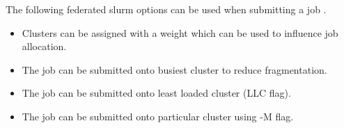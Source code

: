 \documentclass[conference]{IEEEtran}
\begin{document}
The following federated \gls{slurm} options can be used when submitting a job .

\begin{itemize}
    \item Clusters can be assigned with a weight which can be used to influence job allocation.
    \item The job can be submitted onto busiest cluster to reduce fragmentation.
    \item The job can be submitted onto least loaded cluster (LLC flag).
    \item The job can be submitted onto particular cluster using -M flag.
\end{itemize}







\end{document}
